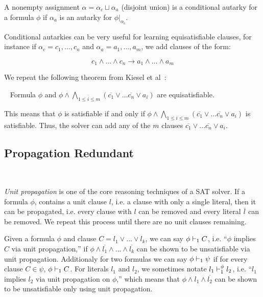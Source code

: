 \begin{definition}
    A nonempty assignment $\alpha = \alpha_c \sqcup \alpha_a$ (disjoint union) is a conditional autarky for a formula $\phi$ if $\alpha_a$ is an autarky for $\phi|_{\alpha_c}$.
\end{definition}

Conditional autarkies can be very useful for learning equisatisfiable clauses, for instance if $\alpha_c = c_1, ..., c_n$ and $\alpha_a = a_1, ..., a_m$, we add clauses of the form:

\begin{equation*}
    c_1 \land ... \land c_n \rightarrow a_1 \land ... \land a_m
\end{equation*}

We repeat the following theorem from Kiesel et al~\cite{conditionalautarkies}:

\begin{theorem}~\label{thm:gbcequisat}
    Formula $\phi$ and $\phi \land \bigwedge_{1 \leq i \leq m} (\overline{c_1} \lor ... \overline{c_n} \lor a_i)$ are equisatisfiable.
\end{theorem}

This means that $\phi$ is satisfiable if and only if $\phi \land \bigwedge_{1 \leq i \leq m} (\overline{c_1} \lor ... \overline{c_n} \lor a_i)$ is satisfiable. Thus, the solver can add any of the $m$ clauses $\overline{c_1} \lor ... \overline{c_n} \lor a_i$.

\subsection{Propagation Redundant}~\label{subsec:pr}

\emph{Unit propagation} is one of the core reasoning techniques of a SAT solver. If a formula $\phi$, contains a unit clause $l$, i.e. a clause with only a single literal, then it can be propagated, i.e. every clause with $l$ can be removed and every literal $\overline{l}$ can be removed. We repeat this process until there are no unit clauses remaining.

Given a formula $\phi$ and clause $C = l_1 \lor ... \lor l_k$, we can say $\phi \vdash_1 C$, i.e. ``$\phi$ implies $C$ via unit propagation,'' if $\phi \land \overline{l_1} \land ... \land \overline{l_k}$ can be shown to be unsatisfiable via unit propagation. Additionaly for two formulas we can say $\phi \vdash_1 \psi$ if for every clause $C \in \psi$, $\phi \vdash_1 C$. For literals $l_1$ and $l_2$, we sometimes notate $l_1 \vdash_1^\phi l_2$, i.e. ``$l_1$ implies $l_2$ via unit propagation on $\phi$,'' which means that $\phi \land l_1 \land \overline{l_2}$ can be shown to be unsatisfiable only using unit propagation.  %

